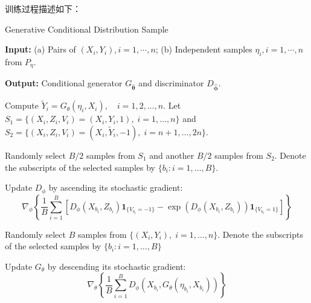 \documentclass{myarticle}
\begin{document}
    训练过程描述如下：
    \begin{algorithm}
        \caption{Generative Conditional Distribution Sample}
        \label{alg2: GCDS}

        \textbf{Input:} (a) Pairs of $(X_{i},Y_{i}),i=1,\cdots,n$; (b) Independent samples $\eta_{i},i=1,\cdots,n$ from $P_{\eta}$.

        \textbf{Output:} Conditional generator $G_{\boldsymbol{\hat{\theta}}}$ and discriminator $D_{\boldsymbol{\hat{\phi}}}$.
        
        \begin{algorithmic}[1]
                \State Compute $\widetilde{Y}_i = G_{\theta}(\eta_i, X_i), \quad i = 1, 2, \ldots, n$. Let $S_1 = \{(X_i, Z_i, V_i) = (X_i, Y_i, 1), \; i = 1, \ldots, n \}$ and $S_2 = \{(X_i, Z_i, V_i) = (X_i, \widetilde{Y}_i, -1), \; i = n + 1, \ldots, 2n\}$.

                \State Randomly select $B/2$ samples from $S_1$ and another $B/2$ samples from $S_2$. Denote the subscripts of the selected samples by $\{b_i : i = 1, \ldots, B \}$.

                \State Update $D_{\phi}$ by ascending its stochastic gradient:
                $$\nabla_{\phi} \left\{ \frac{1}{B} \sum_{i=1}^{B} \left[ D_{\phi}(X_{b_i}, Z_{b_i}) \mathbf{1}_{\{V_{b_i} = -1\}} - \exp(D_{\phi}(X_{b_i}, Z_{b_i})) \mathbf{1}_{\{V_{b_i} = 1\}} \right] \right\}$$

                \State Randomly select $B$ samples from $\{(X_i, Y_i), \; i = 1, \ldots, n \}$. Denote the subscripts of the selected samples by $\{b_i : i = 1, \ldots, B \}$

                \State Update $G_{\theta}$ by descending its stochastic gradient:
                $$\nabla_{\theta} \left\{ \frac{1}{B} \sum_{i=1}^{B} D_{\phi}(X_{b_i}, G_{\theta}(\eta_{b_i}, X_{b_i})) \right\}$$
            \EndWhile
        \end{algorithmic}
    \end{algorithm}
    
    
    \clearpage
    
    
\end{document}
